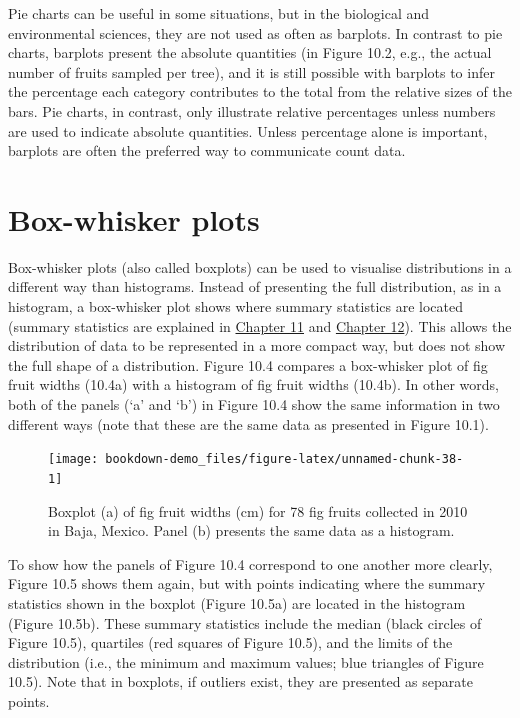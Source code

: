 \documentclass[
]{scrbook}
\begin{document}
Pie charts can be useful in some situations, but in the biological and environmental sciences, they are not used as often as barplots.
In contrast to pie charts, barplots present the absolute quantities (in Figure 10.2, e.g., the actual number of fruits sampled per tree), and it is still possible with barplots to infer the percentage each category contributes to the total from the relative sizes of the bars.
Pie charts, in contrast, only illustrate relative percentages unless numbers are used to indicate absolute quantities.
Unless percentage alone is important, barplots are often the preferred way to communicate count data.

\hypertarget{box-whisker-plots}{%
\section{Box-whisker plots}\label{box-whisker-plots}}

Box-whisker plots (also called boxplots) can be used to visualise distributions in a different way than histograms.
Instead of presenting the full distribution, as in a histogram, a box-whisker plot shows where summary statistics are located (summary statistics are explained in \protect\hyperlink{Chapter_11}{Chapter 11} and \protect\hyperlink{Chapter_12}{Chapter 12}).
This allows the distribution of data to be represented in a more compact way, but does not show the full shape of a distribution.
Figure 10.4 compares a box-whisker plot of fig fruit widths (10.4a) with a histogram of fig fruit widths (10.4b).
In other words, both of the panels (`a' and `b') in Figure 10.4 show the same information in two different ways (note that these are the same data as presented in Figure 10.1).

\begin{figure}
\texttt{[image: bookdown-demo\_files/figure-latex/unnamed-chunk-38-1]} \caption{Boxplot (a) of fig fruit widths (cm) for 78 fig fruits collected in 2010 in Baja, Mexico. Panel (b) presents the same data as a histogram.}\label{fig:unnamed-chunk-38}
\end{figure}

To show how the panels of Figure 10.4 correspond to one another more clearly, Figure 10.5 shows them again, but with points indicating where the summary statistics shown in the boxplot (Figure 10.5a) are located in the histogram (Figure 10.5b).
These summary statistics include the median (black circles of Figure 10.5), quartiles (red squares of Figure 10.5), and the limits of the distribution (i.e., the minimum and maximum values; blue triangles of Figure 10.5).
Note that in boxplots, if outliers exist, they are presented as separate points.
\end{document}
